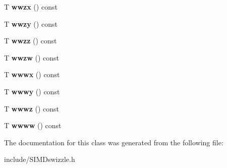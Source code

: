 \begin{DoxyCompactItemize}
\item 
T {\bfseries wwzx} () const \hypertarget{classSIMD__32bitSwizzleAble_aed3149233da2e2d4b0936b23ca53ed80}{}\label{classSIMD__32bitSwizzleAble_aed3149233da2e2d4b0936b23ca53ed80}

\item 
T {\bfseries wwzy} () const \hypertarget{classSIMD__32bitSwizzleAble_aa1e3bedab7552c0c2cba282a3c805279}{}\label{classSIMD__32bitSwizzleAble_aa1e3bedab7552c0c2cba282a3c805279}

\item 
T {\bfseries wwzz} () const \hypertarget{classSIMD__32bitSwizzleAble_a9f7d04a9cfc34b45a913494bb076f404}{}\label{classSIMD__32bitSwizzleAble_a9f7d04a9cfc34b45a913494bb076f404}

\item 
T {\bfseries wwzw} () const \hypertarget{classSIMD__32bitSwizzleAble_afe78ba3c816089e36cb23b70ac9c8d83}{}\label{classSIMD__32bitSwizzleAble_afe78ba3c816089e36cb23b70ac9c8d83}

\item 
T {\bfseries wwwx} () const \hypertarget{classSIMD__32bitSwizzleAble_ab8382eac3447fe475c64c514721e17e2}{}\label{classSIMD__32bitSwizzleAble_ab8382eac3447fe475c64c514721e17e2}

\item 
T {\bfseries wwwy} () const \hypertarget{classSIMD__32bitSwizzleAble_abd69eb1a14c48da33582549d3ac9a94b}{}\label{classSIMD__32bitSwizzleAble_abd69eb1a14c48da33582549d3ac9a94b}

\item 
T {\bfseries wwwz} () const \hypertarget{classSIMD__32bitSwizzleAble_ac25fff8c103bc4afc437272046ff56ee}{}\label{classSIMD__32bitSwizzleAble_ac25fff8c103bc4afc437272046ff56ee}

\item 
T {\bfseries wwww} () const \hypertarget{classSIMD__32bitSwizzleAble_a1d662b71ba42ae9e076f6f2345632d5e}{}\label{classSIMD__32bitSwizzleAble_a1d662b71ba42ae9e076f6f2345632d5e}

\end{DoxyCompactItemize}


The documentation for this class was generated from the following file\+:\begin{DoxyCompactItemize}
\item 
include/S\+I\+M\+Dswizzle.\+h\end{DoxyCompactItemize}
